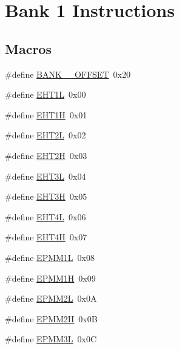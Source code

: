 \hypertarget{group___b_a_n_k__1}{}\section{Bank 1 Instructions}
\label{group___b_a_n_k__1}
\subsection*{Macros}
\begin{DoxyCompactItemize}
\item 
\#define \mbox{\hyperlink{group___b_a_n_k__1_gae57b98d650d14147609e03fc9a65cd02}{B\+A\+N\+K\+\_\+\_\+\+O\+F\+F\+S\+ET}}~0x20
\item 
\#define \mbox{\hyperlink{group___b_a_n_k__1_ga6f6864f4f1fbd0bcac1530eff13c308d}{E\+H\+T1L}}~0x00
\item 
\#define \mbox{\hyperlink{group___b_a_n_k__1_gab1713ab4c7c67c49b7b733e3c03ba0c4}{E\+H\+T1H}}~0x01
\item 
\#define \mbox{\hyperlink{group___b_a_n_k__1_gac02f56ab8242130a06157f05119a8e27}{E\+H\+T2L}}~0x02
\item 
\#define \mbox{\hyperlink{group___b_a_n_k__1_gadeefd1d76824d50e1c2e377a05e874e1}{E\+H\+T2H}}~0x03
\item 
\#define \mbox{\hyperlink{group___b_a_n_k__1_ga9e30ff3712ccd0bef607434f477dd82f}{E\+H\+T3L}}~0x04
\item 
\#define \mbox{\hyperlink{group___b_a_n_k__1_gab54f3dda9d1efdef4007d5f7f069fe04}{E\+H\+T3H}}~0x05
\item 
\#define \mbox{\hyperlink{group___b_a_n_k__1_ga8c777608b61bde379fd4f0630f5683eb}{E\+H\+T4L}}~0x06
\item 
\#define \mbox{\hyperlink{group___b_a_n_k__1_gad7040dda7193d83ef863f10c2a70d672}{E\+H\+T4H}}~0x07
\item 
\#define \mbox{\hyperlink{group___b_a_n_k__1_gac12b8f84b7e6c01021c6f48b8fb8b81a}{E\+P\+M\+M1L}}~0x08
\item 
\#define \mbox{\hyperlink{group___b_a_n_k__1_ga88deb2d8fe728cf9bf5efb7e1ea35d04}{E\+P\+M\+M1H}}~0x09
\item 
\#define \mbox{\hyperlink{group___b_a_n_k__1_gafea14a04026dc5ffbe769622492f323c}{E\+P\+M\+M2L}}~0x0A
\item 
\#define \mbox{\hyperlink{group___b_a_n_k__1_gaa5f65cc04048e8967bb2b7a69dd1f2bc}{E\+P\+M\+M2H}}~0x0B
\item 
\#define \mbox{\hyperlink{group___b_a_n_k__1_ga9fd841dc4035397b8b58e49488ae69cb}{E\+P\+M\+M3L}}~0x0C

\end{DoxyCompactItemize}
